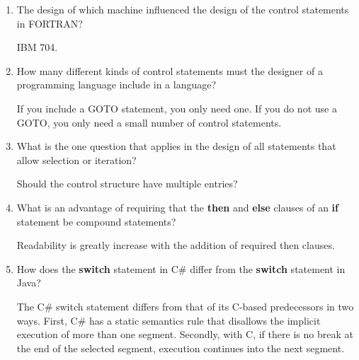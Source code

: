 \begin{enumerate}
  \item The design of which machine influenced the design
    of the control statements in FORTRAN?
 
 \begin{answer}

    IBM 704.

    \end{answer}



  \item How many different kinds of control statements
    must the designer of a programming language include
    in a language?

  \begin{answer}

    If you include a GOTO statement, you only need one.  If you do not use a GOTO, you only need a small number of control statements.

    \end{answer}



  \item What is the one question that applies in the
    design of all statements that allow selection or
    iteration?
  
\begin{answer}

   Should the control structure have multiple entries?

    \end{answer}



  \item What is an advantage of requiring that
    the \textbf{then} and \textbf{else} clauses of
    an \textbf{if} statement be compound statements?

  \begin{answer}

    Readability is greatly increase with the addition of required then clauses.

    \end{answer}


  \item How does the \textbf{switch} statement in C\#
    differ from the \textbf{switch} statement in Java?

  \begin{answer}

   The C# switch statement differs from that of its C-based predecessors
in two ways. First, C# has a static semantics rule that disallows the implicit
execution of more than one segment.  Secondly, with C, if there is no break at the end of the selected segment, execution continues into the next segment.


\end{answer}
\end{enumerate}
